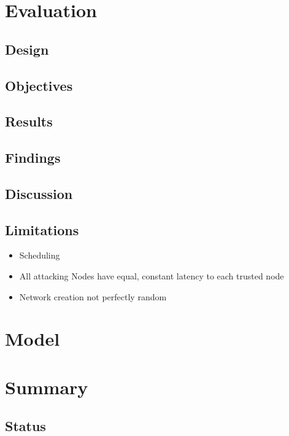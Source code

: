 \documentclass[a4paper,12pt,twoside]{report}
\begin{document}
\chapter{Evaluation}

\section{Design}
	
\section{Objectives}

\section{Results}

\section{Findings}

\section{Discussion}

\section{Limitations}
\begin{itemize}
\item Scheduling
\item All attacking Nodes have equal, constant latency to each trusted node
\item Network creation not perfectly random

\end{itemize}


\chapter{Model}



\chapter{Summary}

\section{Status}
\end{document}

